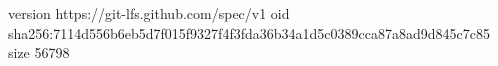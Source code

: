 version https://git-lfs.github.com/spec/v1
oid sha256:7114d556b6eb5d7f015f9327f4f3fda36b34a1d5c0389cca87a8ad9d845c7c85
size 56798
